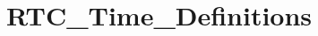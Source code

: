 \hypertarget{group___r_t_c___time___definitions}{\section{R\-T\-C\-\_\-\-Time\-\_\-\-Definitions}
\label{group___r_t_c___time___definitions}
}
